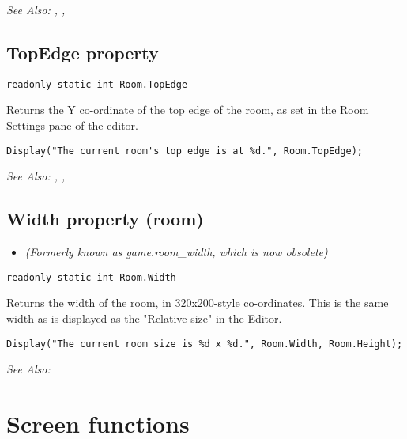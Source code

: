 \it{See Also:} , ,


\subsection{TopEdge property}\label{Room.TopEdge}%

\begin{verbatim}
readonly static int Room.TopEdge
\end{verbatim}
Returns the Y co-ordinate of the top edge of the room, as set in the Room Settings
pane of the editor.

\begin{verbatim}
Display("The current room's top edge is at %d.", Room.TopEdge);
\end{verbatim}

\it{See Also:} , ,


\subsection{Width property (room)}\label{Room.Width}%

\begin{itemize}
\item \it{(Formerly known as game.room_width, which is now obsolete)}
\end{itemize}

\begin{verbatim}
readonly static int Room.Width
\end{verbatim}
Returns the width of the room, in 320x200-style co-ordinates. This is
the same width as is displayed as the "Relative size" in the Editor.

\begin{verbatim}
Display("The current room size is %d x %d.", Room.Width, Room.Height);
\end{verbatim}

\it{See Also:} 



\section{Screen functions}%


